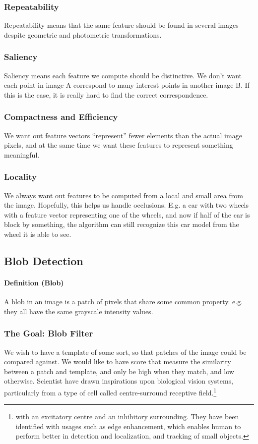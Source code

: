 \documentclass[11pt]{article}
\begin{document}
\subsubsection{Repeatability}
Repeatability means that the same feature should be found in several images despite geometric and photometric transformations. 
\subsubsection{Saliency}
Saliency means each feature we compute should be distinctive. We don't want each point in image A correspond to many interest points in another image B. If this is the case, it is really hard to find the correct correspondence. 
\subsubsection{Compactness and Efficiency}
We want out feature vectors ``represent'' fewer elements than the actual image pixels, and at the same time we want these features to represent something meaningful. 
\subsubsection{Locality}
We always want out features to be computed from a local and small area from the image. Hopefully, this helps us handle occlusions. E.g. a car with two wheels with a feature vector representing one of the wheels, and now if half of the car is block by something, the algorithm can still recognize this car model from the wheel it is able to see.   

\subsection{Blob Detection}
\paragraph{Definition (Blob)} A blob in an image is a patch of pixels that share some common property. e.g. they all have the same grayscale intensity values. 

\subsubsection{The Goal: Blob Filter}
We wish to have a template of some sort, so that patches of the image could be compared against. We would like to have score that measure the similarity between a patch and template, and only be high when they match, and low otherwise. Scientist have drawn inspirations upon biological vision systems, particularly from a type of cell called centre-surround receptive field.\footnote{with an excitatory centre and an inhibitory surrounding. They have been identified with usages such as edge enhancement, which enables human to perform better in detection and localization, and tracking of small objects.}
\end{document}
